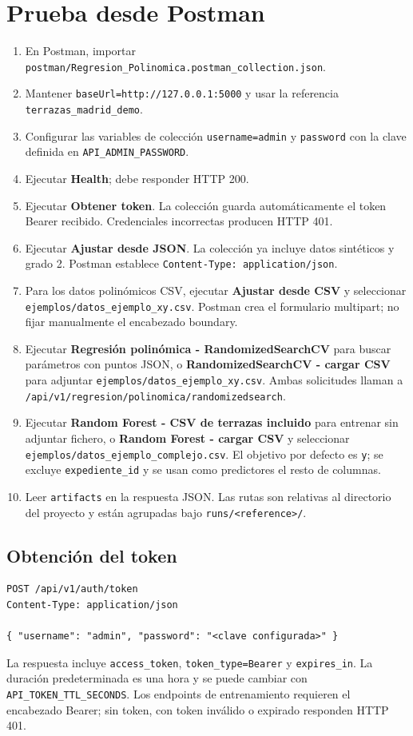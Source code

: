 \documentclass[11pt,a4paper]{article}
\begin{document}
\section{Prueba desde Postman}
\begin{enumerate}
\item En Postman, importar \texttt{postman/Regresion\_Polinomica.postman\_collection.json}.
\item Mantener \texttt{baseUrl=http://127.0.0.1:5000} y usar la referencia \texttt{terrazas\_madrid\_demo}.
\item Configurar las variables de colección \texttt{username=admin} y \texttt{password} con la clave definida en \texttt{API\_ADMIN\_PASSWORD}.
\item Ejecutar \textbf{Health}; debe responder HTTP 200.
\item Ejecutar \textbf{Obtener token}. La colección guarda automáticamente el token Bearer recibido. Credenciales incorrectas producen HTTP 401.
\item Ejecutar \textbf{Ajustar desde JSON}. La colección ya incluye datos sintéticos y grado 2. Postman establece \texttt{Content-Type: application/json}.
\item Para los datos polinómicos CSV, ejecutar \textbf{Ajustar desde CSV} y seleccionar \texttt{ejemplos/datos\_ejemplo\_xy.csv}. Postman crea el formulario multipart; no fijar manualmente el encabezado boundary.
\item Ejecutar \textbf{Regresión polinómica - RandomizedSearchCV} para buscar parámetros con puntos JSON, o \textbf{RandomizedSearchCV - cargar CSV} para adjuntar \texttt{ejemplos/datos\_ejemplo\_xy.csv}. Ambas solicitudes llaman a \texttt{/api/v1/regresion/polinomica/randomizedsearch}.
\item Ejecutar \textbf{Random Forest - CSV de terrazas incluido} para entrenar sin adjuntar fichero, o \textbf{Random Forest - cargar CSV} y seleccionar \texttt{ejemplos/datos\_ejemplo\_complejo.csv}. El objetivo por defecto es \texttt{y}; se excluye \texttt{expediente\_id} y se usan como predictores el resto de columnas.
\item Leer \texttt{artifacts} en la respuesta JSON. Las rutas son relativas al directorio del proyecto y están agrupadas bajo \texttt{runs/<reference>/}.
\end{enumerate}

\subsection{Obtención del token}
\begin{lstlisting}
POST /api/v1/auth/token
Content-Type: application/json

{ "username": "admin", "password": "<clave configurada>" }
\end{lstlisting}
La respuesta incluye \texttt{access\_token}, \texttt{token\_type=Bearer} y \texttt{expires\_in}. La duración predeterminada es una hora y se puede cambiar con \texttt{API\_TOKEN\_TTL\_SECONDS}. Los endpoints de entrenamiento requieren el encabezado Bearer; sin token, con token inválido o expirado responden HTTP 401.
\end{document}
